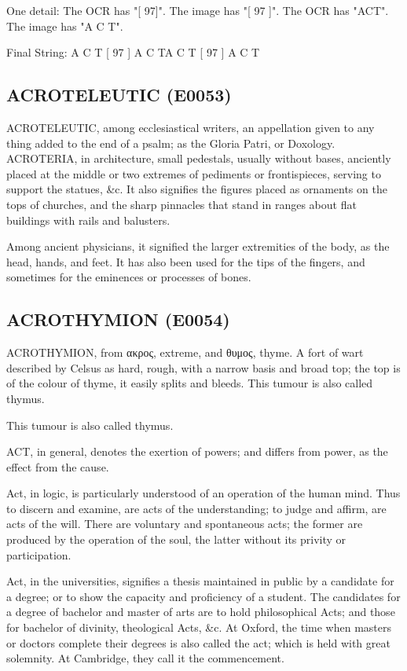 \documentclass{article}
\begin{document}
One detail: The OCR has "[ 97]". The image has "[ 97 ]".
The OCR has "ACT". The image has "A C T".

Final String: A C T [ 97 ] A C TA C T [ 97 ] A C T

\subsection*{ACROTELEUTIC (E0053)}
ACROTELEUTIC, among ecclesiastical writers, an appellation given to any thing added to the end of a psalm; as the Gloria Patri, or Doxology.
ACROTERIA, in architecture, small pedestals, usually without bases, anciently placed at the middle or two extremes of pediments or frontispieces, serving to support the statues, \&c. It also signifies the figures placed as ornaments on the tops of churches, and the sharp pinnacles that stand in ranges about flat buildings with rails and balusters.

Among ancient physicians, it signified the larger extremities of the body, as the head, hands, and feet. It has also been used for the tips of the fingers, and sometimes for the eminences or processes of bones.

\subsection*{ACROTHYMION (E0054)}
ACROTHYMION, from ακρος, extreme, and θυμος, thyme. A fort of wart described by Celsus as hard, rough, with a narrow basis and broad top; the top is of the colour of thyme, it easily splits and bleeds. This tumour is also called thymus.

This tumour is also called thymus.

ACT, in general, denotes the exertion of powers; and differs from power, as the effect from the cause.

Act, in logic, is particularly understood of an operation of the human mind. Thus to discern and examine, are acts of the understanding; to judge and affirm, are acts of the will. There are voluntary and spontaneous acts; the former are produced by the operation of the soul, the latter without its privity or participation.

Act, in the universities, signifies a thesis maintained in public by a candidate for a degree; or to show the capacity and proficiency of a student. The candidates for a degree of bachelor and master of arts are to hold philosophical Acts; and those for bachelor of divinity, theological Acts, \&c. At Oxford, the time when masters or doctors complete their degrees is also called the act; which is held with great solemnity. At Cambridge, they call it the commencement.
\end{document}
